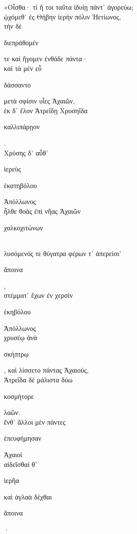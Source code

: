 \documentclass{ransom}
\begin{document}
\renewcommand{\rightheaderwhat}{\rightheaderwhatglosses}%
\begin{foreignpage}
\begin{graytext}
«Οἶσθα· τί ἤ τοι ταῦτα ἰδυίῃ πάντ᾽ ἀγορεύω;\hfill{}\\
ᾠχόμεθ᾽ ἐς Θήβην ἱερὴν πόλιν Ἠετίωνος,\\
τὴν δὲ \begin{whitetext}διεπράθομέν\end{whitetext} τε καὶ ἤγομεν ἐνθάδε πάντα·\\
καὶ τὰ μὲν εὖ \begin{whitetext}δάσσαντο\end{whitetext} μετὰ σφίσιν υἷες Ἀχαιῶν,\\
ἐκ δ᾽ ἕλον Ἀτρεΐδῃ Χρυσηΐδα \begin{whitetext}καλλιπάρῃον\end{whitetext}.\\
Χρύσης δ᾽ αὖθ᾽ \begin{whitetext}ἱερεὺς\end{whitetext} \begin{whitetext}ἑκατηβόλου\end{whitetext} Ἀπόλλωνος\hfill{}\\
ἦλθε θοὰς ἐπὶ νῆας Ἀχαιῶν \begin{whitetext}χαλκοχιτώνων\end{whitetext}\\
λυσόμενός τε θύγατρα φέρων τ᾽ ἀπερείσι᾽ \begin{whitetext}ἄποινα\end{whitetext},\\
στέμματ᾽ ἔχων ἐν χερσὶν \begin{whitetext}ἑκηβόλου\end{whitetext} Ἀπόλλωνος\\
χρυσέῳ ἀνὰ \begin{whitetext}σκήπτρῳ\end{whitetext}, καὶ λίσσετο πάντας Ἀχαιούς,\\
Ἀτρεΐδα δὲ μάλιστα δύω \begin{whitetext}κοσμήτορε\end{whitetext} λαῶν.\hfill{}\\
ἔνθ᾽ ἄλλοι μὲν πάντες \begin{whitetext}ἐπευφήμησαν\end{whitetext} Ἀχαιοὶ\\
αἰδεῖσθαί θ᾽ \begin{whitetext}ἱερῆα\end{whitetext} καὶ ἀγλαὰ δέχθαι \begin{whitetext}ἄποινα\end{whitetext}·\\

\end{graytext}
\end{foreignpage}
\end{document}
